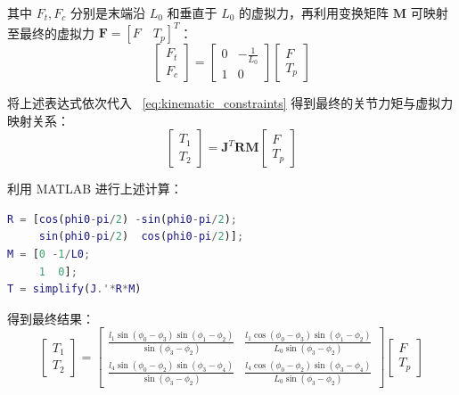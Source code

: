 \documentclass[
  oneside,
  degree=bachelor,
  fullwidthstop=false,
  fontset=fandol,
  times=false,
  minted=true,
  biblatex=true,
]{tongjithesis}
\begin{document}
其中 $F_t, F_c$ 分别是末端沿 $L_0$ 和垂直于 $L_0$ 的虚拟力，再利用变换矩阵 $\boldsymbol{M}$ 可映射至最终的虚拟力 $\boldsymbol{F} = [F \quad T_p]^T$：
\begin{equation}
    \begin{bmatrix}
        F_t \\ F_c
    \end{bmatrix} = 
    \begin{bmatrix}
        0 & -\frac{1}{L_0} \\
        1 & 0
    \end{bmatrix}
    \begin{bmatrix}
        F \\ T_p
    \end{bmatrix}
\end{equation}

将上述表达式依次代入 ~\ref{eq:kinematic_constraints} 得到最终的关节力矩与虚拟力映射关系：
\begin{equation}
    \begin{bmatrix}
        T_1 \\ T_2
    \end{bmatrix} = \boldsymbol{J}^T \boldsymbol{R} \boldsymbol{M}
    \begin{bmatrix}
        F \\ T_p
    \end{bmatrix}
\end{equation}

利用 MATLAB 进行上述计算：
\begin{lstlisting}[language=Matlab]
R = [cos(phi0-pi/2) -sin(phi0-pi/2);
     sin(phi0-pi/2)  cos(phi0-pi/2)];
M = [0 -1/L0;
     1  0];
T = simplify(J.'*R*M)
\end{lstlisting}

得到最终结果：
\begin{equation}
    \begin{bmatrix}
        T_1 \\ T_2
    \end{bmatrix} = 
    \begin{bmatrix}
        \frac{l_1 \sin(\phi_0 - \phi_3) \sin(\phi_1 - \phi_2)}{\sin(\phi_3 - \phi_2)} & \frac{l_1 \cos(\phi_0 - \phi_3) \sin(\phi_1 - \phi_2)}{L_0 \sin(\phi_3 - \phi_2)} \\
        \frac{l_4 \sin(\phi_0 - \phi_2) \sin(\phi_3 - \phi_4)}{\sin(\phi_3 - \phi_2)} & \frac{l_4 \cos(\phi_0 - \phi_2) \sin(\phi_3 - \phi_4)}{L_0 \sin(\phi_3 - \phi_2)}
    \end{bmatrix}
    \begin{bmatrix}
        F \\ T_p
    \end{bmatrix}
\end{equation}
\end{document}

